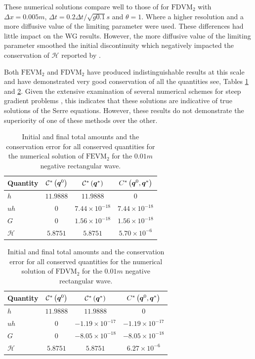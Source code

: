 These numerical solutions compare well to those of \citet{Zoppou-etal-2017} for $\text{FDVM}_2$ with $\Delta x = 0.005m$, $\Delta t = 0.2 \Delta t / \sqrt{g 0.1} s$ and $\theta = 1$. Where a higher resolution and a more diffusive value of the limiting parameter were used. These differences had little impact on the WG results. However, the more diffusive value of the limiting parameter smoothed the initial discontinuity which negatively impacted the conservation of $\mathcal{H}$ reported by \citet{Zoppou-etal-2017}.

Both $\text{FEVM}_2$ and $\text{FDVM}_2$ have produced indistinguishable results at this scale and have demonstrated very good conservation of all the quantities see, Tables \ref{tab:ConservationSegurFEVM1cm} and \ref{tab:ConservationSegurFDVM1cm}. Given the extensive examination of several numerical schemes for steep gradient problems \cite{Pitt-2018-61}, this indicates that these solutions are indicative of true solutions of the Serre equations. However, these results do not demonstrate the superiority of one of these methods over the other. 
%
\begin{table}
	\centering
	\begin{tabular}{l  c  c c}
		Quantity& $\mathcal{C}^*\left(\boldsymbol{q}^0\right)$ & $\mathcal{C}^*\left(\boldsymbol{q}^*\right)$ & ${C}^*\left(\boldsymbol{q}^0,\boldsymbol{q}^*\right)$  \B\\
		\hline
		$h$ & $11.9888$ & $11.9888$ & $0$ \T\\
		$uh$ & $0$ & $7.44 \times 10^{-18}$ & $7.44 \times 10^{-18}$\\
		$G$ & $0$ & $1.56\times 10^{-18}$ & $1.56\times 10^{-18}$\\
		$\mathcal{H}$ & $5.8751$ & $5.8751$ & $5.70 \times 10^{-6}$ \B \\
		\hline
	\end{tabular}
	\caption{Initial and final total amounts and the conservation error for all conserved quantities for the numerical solution of $\text{FEVM}_2$ for the $0.01m$ negative rectangular wave.}
	\label{tab:ConservationSegurFEVM1cm}
\end{table} 
%
\begin{table}
	\centering
	\begin{tabular}{l  c  c c}
		Quantity& $\mathcal{C}^*\left(\boldsymbol{q}^0\right)$ & $\mathcal{C}^*\left(\boldsymbol{q}^*\right)$ & ${C}^*\left(\boldsymbol{q}^0,\boldsymbol{q}^*\right)$ \B \\
		\hline
		$h$ & $11.9888$ & $11.9888$ & $0$ \T\\
		$uh$ & $0$ & $-1.19 \times 10^{-17}$ & $-1.19 \times 10^{-17}$\\
		$G$ & $0$ & $-8.05\times 10^{-18}$ & $-8.05\times 10^{-18}$\\
		$\mathcal{H}$ & $5.8751$ & $5.8751$ & $6.27 \times 10^{-6}$ \B\\
		\hline
	\end{tabular}
	\caption{Initial and final total amounts and the conservation error for all conserved quantities for the numerical solution of $\text{FDVM}_2$ for the $0.01m$ negative rectangular wave.}
	\label{tab:ConservationSegurFDVM1cm}
\end{table}  
 

